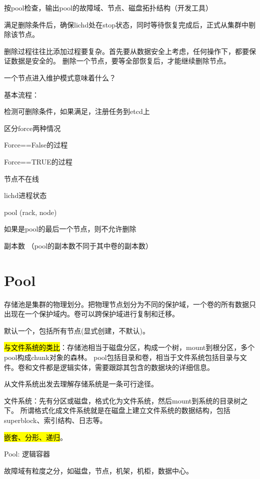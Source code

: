 按pool检查，输出pool的故障域、节点、磁盘拓扑结构（开发工具）

满足删除条件后，确保lichd处在stop状态，同时等待恢复完成后，正式从集群中剔除该节点。

删除过程往往比添加过程要复杂。首先要从数据安全上考虑，任何操作下，都要保证数据是安全的。
删除一个节点，要等全部恢复后，才能继续删除节点。

一个节点进入维护模式意味着什么？

基本流程：
\begin{enumbox}
\item 检测可删除条件，如果满足，注册任务到etcd上
\item 区分force两种情况
\item Force==False的过程
\item Force==TRUE的过程
\item *
\item 节点不在线
\item lichd进程状态
\item pool (rack, node)
\item 如果是pool的最后一个节点，则不允许删除
\item 副本数 （pool的副本数不同于其中卷的副本数）
\end{enumbox}

\section{Pool}

存储池是集群的物理划分。把物理节点划分为不同的保护域，一个卷的所有数据只出现在一个保护域内。卷可以跨保护域进行复制和迁移。

默认一个，包括所有节点(显式创建，不默认)。

\hl{与文件系统的类比}：存储池相当于磁盘分区，构成一个树，mount到根分区，多个pool构成chunk对象的森林。
pool包括目录和卷，相当于文件系统包括目录与文件。卷和文件都是逻辑实体，需要跟踪其包含的数据块的详细信息。

从文件系统出发去理解存储系统是一条可行途径。

文件系统：先有分区或磁盘，格式化为文件系统，然后mount到系统的目录树之下。
所谓格式化成文件系统就是在磁盘上建立文件系统的数据结构，包括superblock、索引结构、日志等。

\hl{嵌套、分形、递归}。


Pool: 逻辑容器

故障域有粒度之分，如磁盘，节点，机架，机柜，数据中心。


